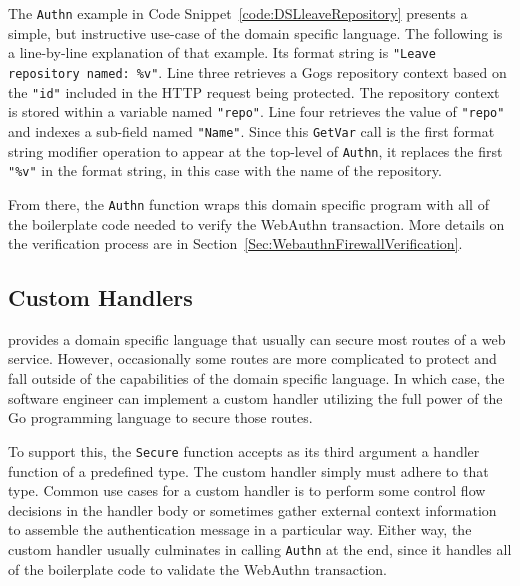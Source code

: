 
The \lstinline{Authn} example in Code Snippet~\ref{code:DSLleaveRepository} presents a simple, but instructive use-case of the domain specific language. The following is a line-by-line explanation of that example. Its format string is \lstinline{"Leave repository named: %v"}. Line three retrieves a Gogs repository context based on the \lstinline{"id"} included in the HTTP request being protected. The repository context is stored within a variable named \lstinline{"repo"}. Line four retrieves the value of \lstinline{"repo"} and indexes a sub-field named \lstinline{"Name"}. Since this \lstinline{GetVar} call is the first format string modifier operation to appear at the top-level of \lstinline{Authn}, it replaces the first \lstinline{"%v"} in the format string, in this case with the name of the repository.

From there, the \lstinline{Authn} function wraps this domain specific program with all of the boilerplate code needed to verify the WebAuthn transaction. More details on the verification process are in Section~\ref{Sec:WebauthnFirewallVerification}.




\subsection{Custom Handlers}\label{Sec:CustomHandlers}



\sys{} provides a domain specific language that usually can secure most routes of a web service. However, occasionally some routes are more complicated to protect and fall outside of the capabilities of the domain specific language. In which case, the software engineer can implement a custom handler utilizing the full power of the Go programming language to secure those routes.

To support this, the \lstinline{Secure} function accepts as its third argument a handler function of a predefined type. The custom handler simply must adhere to that type. Common use cases for a custom handler is to perform some control flow decisions in the handler body or sometimes gather external context information to assemble the authentication message in a particular way. Either way, the custom handler usually culminates in calling \lstinline{Authn} at the end, since it handles all of the boilerplate code to validate the WebAuthn transaction.

